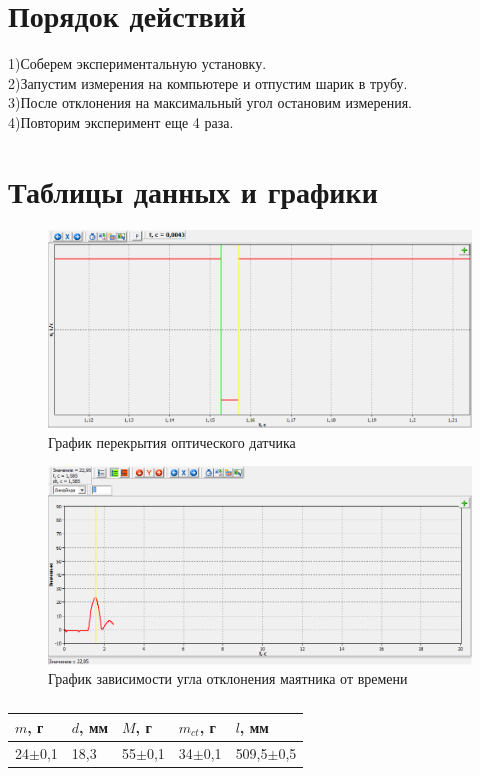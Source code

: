 \documentclass[12pt]{article}
\begin{document}
	\section{Порядок действий}
	1)Соберем экспериментальную установку.\\
	2)Запустим измерения на компьютере и отпустим шарик в трубу.\\
	3)После отклонения на максимальный угол остановим измерения.\\
	4)Повторим эксперимент еще 4 раза.
	\section{Таблицы данных и графики}
		\begin{figure}[H]
		\centering
		\includegraphics[scale=0.4]{hell1}
		\caption{График перекрытия оптического датчика}
	\end{figure}
	\begin{figure}[H]
		\centering
		\includegraphics[scale=0.4]{hell2}
		\caption{График зависимости угла отклонения маятника от времени}
	\end{figure}
	\begin{table}[H]
		\begin{tabular}{|l|l|l|l|l|}
			\hline
			$m$, г       & $d$, мм & $M$, г     & $m_{ct}$, г & $l$, мм       \\ \hline
			24$\pm$0,1 & 18,3    & 55$\pm$0,1 & 34$\pm$0,1  & 509,5$\pm$0,5 \\ \hline
		\end{tabular}
		\caption{}
	\end{table}
\end{document}
